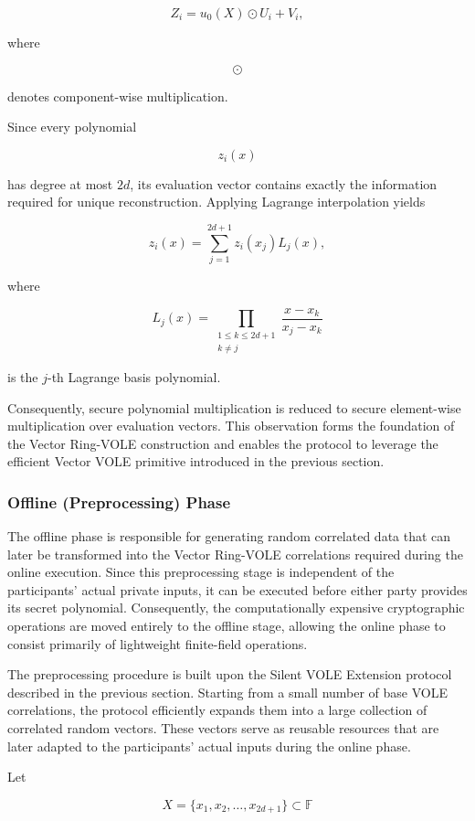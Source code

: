 \documentclass[11pt,a4paper]{article}
\begin{document}
\[
Z_i
=
u_0(X)\odot U_i
+
V_i,
\]

where

\[
\odot
\]

denotes component-wise multiplication.

Since every polynomial

\[
z_i(x)
\]

has degree at most $2d$, its evaluation vector contains exactly the information required for unique
reconstruction. Applying Lagrange interpolation yields

\[
z_i(x)
=
\sum_{j=1}^{2d+1}
z_i(x_j)L_j(x),
\]

where

\[
L_j(x)
=
\prod_{\substack{1\le k\le2d+1\\k\neq j}}
\frac{x-x_k}{x_j-x_k}
\]

is the $j$-th Lagrange basis polynomial.

Consequently, secure polynomial multiplication is reduced to secure element-wise multiplication over
evaluation vectors. This observation forms the foundation of the Vector Ring-VOLE construction and
enables the protocol to leverage the efficient Vector VOLE primitive introduced in the previous section.


\subsubsection{Offline (Preprocessing) Phase}

The offline phase is responsible for generating random correlated data that can later be transformed into
the Vector Ring-VOLE correlations required during the online execution. Since this preprocessing stage is
independent of the participants' actual private inputs, it can be executed before either party provides its
secret polynomial. Consequently, the computationally expensive cryptographic operations are moved entirely
to the offline stage, allowing the online phase to consist primarily of lightweight finite-field operations.

The preprocessing procedure is built upon the Silent VOLE Extension protocol described in the previous
section. Starting from a small number of base VOLE correlations, the protocol efficiently expands them into
a large collection of correlated random vectors. These vectors serve as reusable resources that are later
adapted to the participants' actual inputs during the online phase.

Let

\[
X=\{x_1,x_2,\ldots,x_{2d+1}\}
\subset\mathbb{F}
\]
\end{document}
